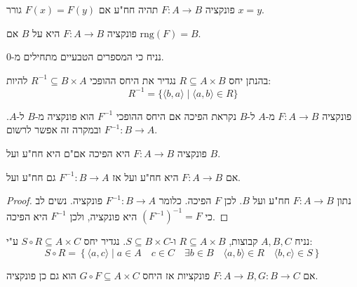 \documentclass{tstextbook}
\begin{document}
\begin{corollary}
פונקציה \(F:A\to B\) תהיה חח"ע אם \(F(x)=F(y)\) גורר \(x=y\).

\end{corollary}
\begin{definition}[על]
פונקציה \(F:A\to B\) היא על \(B\) אם \(\mathrm{rng}(F)=B\).

\end{definition}
\begin{remark}
נניח כי המספרים הטבעיים מתחילים מ-0.

\end{remark}
\begin{definition}
בהנתן יחס \(R\subseteq A\times B\) נגדיר את היחס ההופכי \(R^{-1}\subseteq B\times A\) להיות:
$$R^{-1}=\{\langle b,a\rangle\mid\langle a,b\rangle\in R\}$$

\end{definition}
\begin{definition}
פונקציה \(F:A\to B\) מ-\(A\) ל-\(B\) נקראת הפיכה אם היחס ההופכי \(F^{-1}\) הוא פונקציה מ-\(B\) ל-\(A\). ובמקרה זה אפשר לרשום \(F^{-1}:B\to A\).

\end{definition}
\begin{proposition}
פונקציה \(F:A\to B\) היא הפיכה אם"ם היא חח"ע ועל \(B\).

\end{proposition}
\begin{corollary}
אם \(F:A\to B\) היא חח"ע ועל אז \(F^{-1}:B\to A\) גם חח"ע ועל.

\end{corollary}
\begin{proof}
נתון \(F:A\to B\) חח"ע ועל \(B\). לכן \(F\) הפיכה. כלומר \(F^{-1}:B\to A\) פונקציה. נשים לב כי \((F^{-1})^{-1}=F\) היא פונקציה, ולכן \(F^{-1}\) היא הפיכה. 

\end{proof}
\begin{definition}
נניח \(A,B,C\) קבוצות, \(R\subseteq A\times B\) ו-\(S\subseteq B\times C\). נגדיר יחס \(S\circ R\subseteq A\times C\) ע"י:
$$S\circ R = \left\{  \langle a, c \rangle \mid a\in A\quad c\in C \quad \exists b \in B\quad \langle a, b \rangle \in R\quad \langle b, c \rangle \in S \right\}$$

\end{definition}
\begin{proposition}
אם \(F:A\to B, G:B\to C\) פונקציות אז היחס \(G\circ F\subseteq A\times C\) הוא גם כן פונקציה.

\end{proposition}
\end{document}
